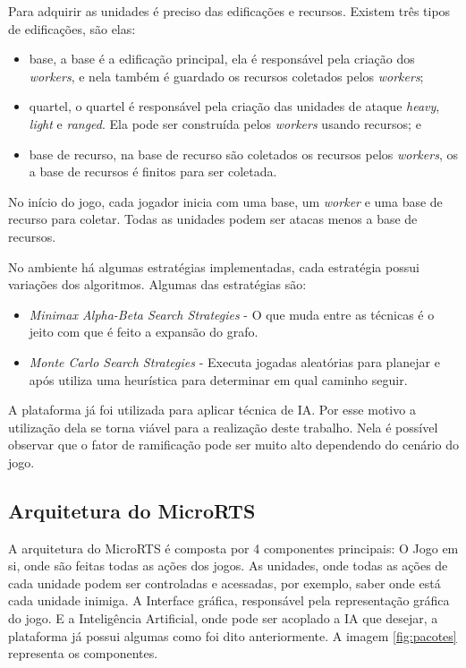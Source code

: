 Para adquirir as unidades é preciso das edificações e recursos. Existem três tipos de edificações, são elas:

\begin{itemize}
	\item base, a base é a edificação principal, ela é responsável pela criação dos \textit{workers}, e nela também é guardado os recursos coletados pelos \textit{workers};
	\item quartel, o quartel é responsável pela criação das unidades de ataque \textit{heavy}, \textit{light} e \textit{ranged}. Ela pode ser construída pelos \textit{workers} usando recursos; e
	\item base de recurso, na base de recurso são coletados os recursos pelos \textit{workers}, os a base de recursos é finitos para ser coletada.
\end{itemize}  

No início do jogo, cada jogador inicia com uma base, um \textit{worker} e uma base de recurso para coletar. Todas as unidades podem ser atacas menos a base de recursos. 
 
No ambiente há algumas estratégias implementadas, cada estratégia possui variações dos algoritmos. Algumas das estratégias são:
 \begin{itemize}
 	\item \textit{Minimax Alpha-Beta Search Strategies} - O que muda entre as técnicas é o jeito com que é feito a expansão do grafo.
 	\item \textit{Monte Carlo Search Strategies} - Executa jogadas aleatórias para planejar e após utiliza uma heurística para determinar em qual caminho seguir.
 \end{itemize}
 
 A plataforma já foi utilizada para aplicar técnica de IA. Por esse motivo a utilização dela se torna viável para a realização deste trabalho. 
Nela é possível observar que o fator de ramificação pode ser muito alto dependendo do cenário do jogo.

\subsection{Arquitetura do MicroRTS}

A arquitetura do MicroRTS é composta por 4 componentes principais: O Jogo em si, onde são feitas todas as ações dos jogos. As unidades, onde todas as ações de cada unidade podem ser controladas e acessadas, por exemplo, saber onde está cada unidade inimiga. A Interface gráfica, responsável pela representação gráfica do jogo. E a Inteligência Artificial, onde pode ser acoplado a IA que desejar, a plataforma já possui algumas como foi dito anteriormente. A imagem \ref{fig:pacotes} representa os componentes.

